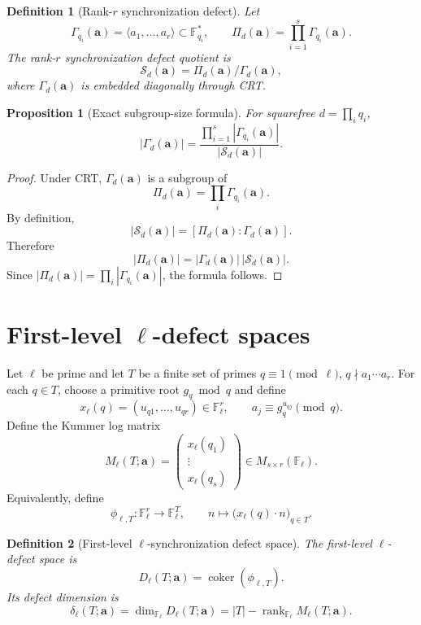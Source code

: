 \documentclass[11pt]{article}
\newtheorem{proposition}{Proposition}
\newtheorem{definition}{Definition}
\newcommand{\F}{\mathbb F}
\newcommand{\coker}{\operatorname{coker}}
\newcommand{\rank}{\operatorname{rank}}
\begin{document}
\begin{definition}[Rank-\(r\) synchronization defect]\label{D:rankr-defect}
Let
\[
\Gamma_{q_i}(\mathbf a)=\langle a_1,\ldots,a_r\rangle\subset\F_{q_i}^*,
\qquad
\Pi_d(\mathbf a)=\prod_{i=1}^s \Gamma_{q_i}(\mathbf a).
\]
The rank-\(r\) synchronization defect quotient is
\[
\mathcal S_d(\mathbf a)=\Pi_d(\mathbf a)/\Gamma_d(\mathbf a),
\]
where \(\Gamma_d(\mathbf a)\) is embedded diagonally through CRT.
\end{definition}

\begin{proposition}[Exact subgroup-size formula]\label{P:size-defect}
For squarefree \(d=\prod_i q_i\),
\[
|\Gamma_d(\mathbf a)|
=
\frac{\prod_{i=1}^s|\Gamma_{q_i}(\mathbf a)|}{|\mathcal S_d(\mathbf a)|}.
\]
\end{proposition}

\begin{proof}
Under CRT, \(\Gamma_d(\mathbf a)\) is a subgroup of
\[
\Pi_d(\mathbf a)=\prod_i\Gamma_{q_i}(\mathbf a).
\]
By definition,
\[
|\mathcal S_d(\mathbf a)|=[\Pi_d(\mathbf a):\Gamma_d(\mathbf a)].
\]
Therefore
\[
|\Pi_d(\mathbf a)|=|\Gamma_d(\mathbf a)|\,|\mathcal S_d(\mathbf a)|.
\]
Since \(|\Pi_d(\mathbf a)|=\prod_i|\Gamma_{q_i}(\mathbf a)|\), the formula follows.
\end{proof}

\section{First-level \(\ell\)-defect spaces}

Let \(\ell\) be prime and let \(T\) be a finite set of primes \(q\equiv1\pmod\ell\), \(q\nmid a_1\cdots a_r\).  For each \(q\in T\), choose a primitive root \(g_q\bmod q\) and define
\[
x_\ell(q)=(u_{q1},\ldots,u_{qr})\in\F_\ell^r,
\qquad
a_j\equiv g_q^{u_{qj}}\pmod q.
\]
Define the Kummer log matrix
\[
M_\ell(T;\mathbf a)
=
\begin{pmatrix}
x_\ell(q_1)\\
\vdots\\
x_\ell(q_s)
\end{pmatrix}
\in M_{s\times r}(\F_\ell).
\]
Equivalently, define
\[
\phi_{\ell,T}:\F_\ell^r\to\F_\ell^T,
\qquad
n\mapsto \big(x_\ell(q)\cdot n\big)_{q\in T}.
\]

\begin{definition}[First-level \(\ell\)-synchronization defect space]\label{D:first-level}
The first-level \(\ell\)-defect space is
\[
D_\ell(T;\mathbf a)=\coker(\phi_{\ell,T}).
\]
Its defect dimension is
\[
\delta_\ell(T;\mathbf a)=\dim_{\F_\ell}D_\ell(T;\mathbf a)
=
|T|-\rank_{\F_\ell}M_\ell(T;\mathbf a).
\]
\end{definition}
\end{document}
